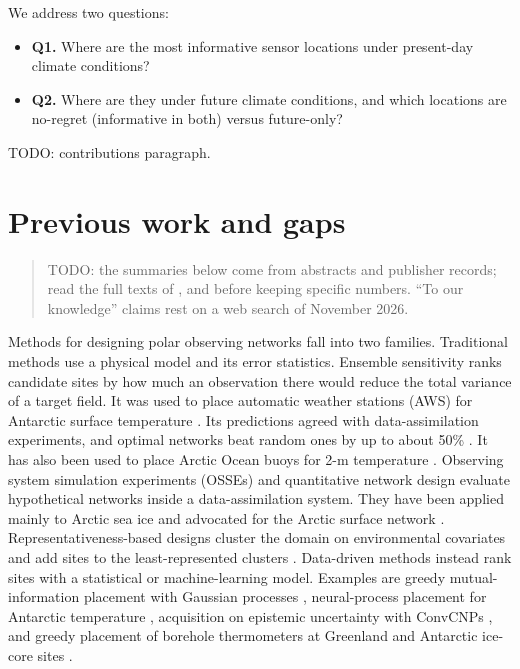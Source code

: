 \documentclass[tc, manuscript]{copernicus}
\providecommand{\tightlist}{\setlength{\itemsep}{0pt}\setlength{\parskip}{0pt}}
\begin{document}
We address two questions:

\begin{itemize}
\tightlist
\item
  \textbf{Q1.} Where are the most informative sensor locations under
  present-day climate conditions?
\item
  \textbf{Q2.} Where are they under future climate conditions, and which
  locations are no-regret (informative in both) versus future-only?
\end{itemize}

TODO: contributions paragraph.

\section{Previous work and gaps}\label{previous-work-and-gaps}

\begin{quote}
TODO: the summaries below come from abstracts and publisher records;
read the full texts of \citet{hakim2020}, \citet{tardif2022} and
\citet{eksen2025} before keeping specific numbers. ``To our knowledge''
claims rest on a web search of November 2026.
\end{quote}

Methods for designing polar observing networks fall into two families.
Traditional methods use a physical model and its error statistics.
Ensemble sensitivity ranks candidate sites by how much an observation
there would reduce the total variance of a target field. It was used to
place automatic weather stations (AWS) for Antarctic surface temperature
\citep{hakim2020}. Its predictions agreed with data-assimilation
experiments, and optimal networks beat random ones by up to about 50\%
\citep{tardif2022}. It has also been used to place Arctic Ocean buoys
for 2-m temperature \citep{kim2024}. Observing system simulation
experiments (OSSEs) and quantitative network design evaluate
hypothetical networks inside a data-assimilation system. They have been
applied mainly to Arctic sea ice \citep{kaminski2015, kaminski2018} and
advocated for the Arctic surface network \citep{masutani2013}.
Representativeness-based designs cluster the domain on environmental
covariates and add sites to the least-represented clusters
\citep{hoffman2013, pallandt2022}. Data-driven methods instead rank
sites with a statistical or machine-learning model. Examples are greedy
mutual-information placement with Gaussian processes \citep{krause2008},
neural-process placement for Antarctic temperature
\citep{andersson2023}, acquisition on epistemic uncertainty with
ConvCNPs \citep{eksen2025}, and greedy placement of borehole
thermometers at Greenland and Antarctic ice-core sites
\citep{shaju2025}.
\end{document}
